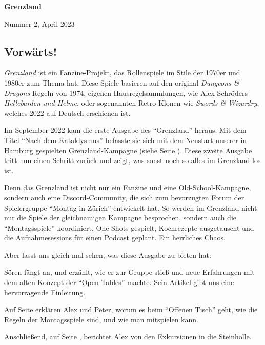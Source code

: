 \documentclass[11pt]{wbzine}
\begin{document}


\shipout\null
\addtocounter{page}{-1}

{\bfseries\fontsize{70}{55}
 \selectfont Grenzland \par}%
 \hrulefill
 Nummer 2, April 2023

\tableofcontents

\pagebreak

\begin{multicols}{2}

\section{Vorwärts!}

\textit{Grenzland} ist ein Fanzine-Projekt, das Rollenspiele im
Stile der 1970er und 1980er zum Thema hat. Diese Spiele basieren auf
den original \textit{Dungeons \& Dragons}-Regeln von 1974, eigenen Hausregelsammlungen, wie Alex Schröders
\textit{Hellebarden und Helme}, oder sogenannten Retro-Klonen wie
\textit{Swords \& Wizardry}, welches 2022 auf Deutsch erschienen
ist.

Im September 2022 kam die erste Ausgabe des ``Grenzland'' heraus.
Mit dem Titel ``Nach dem Kataklysmus'' befasste sie sich
mit dem Neustart unserer in Hamburg gespielten
Grenzland-Kampagne (siehe Seite \pageref{grenzland-reloaded}). Diese
zweite Ausgabe tritt nun einen Schritt zurück und zeigt, was sonst
noch so alles im Grenzland los ist.

Denn das Grenzland ist nicht nur ein Fanzine und eine
Old-School-Kampagne, sondern auch eine Discord-Community, die sich
zum bevorzugten Forum der Spielergruppe ``Montag in
Zürich''
entwickelt hat. So werden im Grenzland nicht nur die Spiele der
gleichnamigen Kampagne besprochen, sondern auch die
``Montagsspiele'' koordiniert, One-Shots gespielt, 
Kochrezepte ausgetauscht und die
Aufnahmesessions für einen Podcast geplant. Ein herrliches Chaos.

Aber lasst uns gleich mal sehen, was diese Ausgabe zu bieten hat:

Sören fängt an, und erzählt, wie er zur Gruppe
stieß und neue Erfahrungen mit dem alten Konzept der ``Open Tables''
machte. Sein Artikel gibt uns eine hervorragende Einleitung.

Auf Seite \pageref{open-tables} erklären Alex und Peter, worum es
beim ``Offenen Tisch'' geht, wie die Regeln der Montagsspiele sind,
und wie man mitspielen kann.

Anschließend, auf Seite \pageref{stonehell}, berichtet Alex von den
Exkursionen in die Steinhölle.


\end{multicols}
\end{document}
